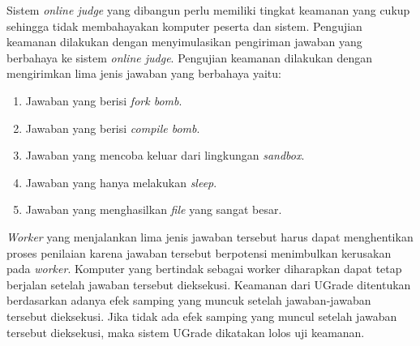 \par Sistem \textit{online judge} yang dibangun perlu memiliki tingkat keamanan yang cukup sehingga tidak membahayakan komputer peserta dan sistem. Pengujian keamanan dilakukan dengan menyimulasikan pengiriman jawaban yang berbahaya ke sistem \textit{online judge}. Pengujian keamanan dilakukan dengan mengirimkan lima jenis jawaban yang berbahaya yaitu:
\begin{enumerate}
    \item Jawaban yang berisi \textit{fork bomb}.
    \item Jawaban yang berisi \textit{compile bomb}.
    \item Jawaban yang mencoba keluar dari lingkungan \textit{sandbox}.
    \item Jawaban yang hanya melakukan \textit{sleep}.
    \item Jawaban yang menghasilkan \textit{file} yang sangat besar.
\end{enumerate} 
\textit{Worker} yang menjalankan lima jenis jawaban tersebut harus dapat menghentikan proses penilaian karena jawaban tersebut berpotensi menimbulkan kerusakan pada \textit{worker}. Komputer yang bertindak sebagai worker diharapkan dapat tetap berjalan setelah jawaban tersebut dieksekusi. Keamanan dari UGrade ditentukan berdasarkan adanya efek samping yang muncuk setelah jawaban-jawaban tersebut dieksekusi. Jika tidak ada efek samping yang muncul setelah jawaban tersebut dieksekusi, maka sistem UGrade dikatakan lolos uji keamanan. 


